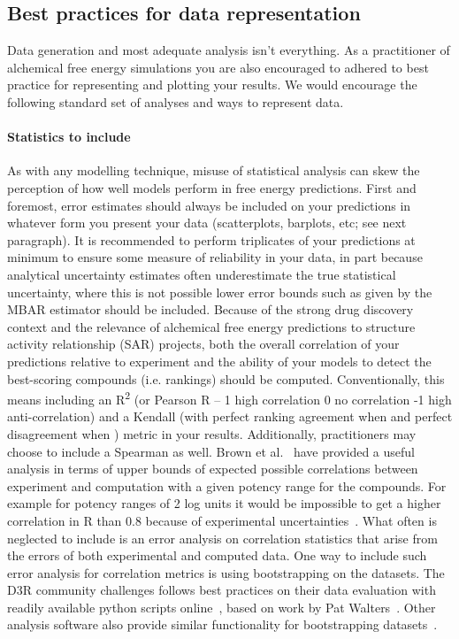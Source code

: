\documentclass[9pt,bestpractices]{livecoms}
\begin{document}
\subsection{Best practices for data representation}
\label{sec:plot_data}
Data generation and most adequate analysis isn't everything. As a practitioner of alchemical free energy simulations you are also encouraged to adhered to best practice for representing and plotting your results. We would encourage the following standard set of analyses and ways to represent data. 
\paragraph{Statistics to include}
As with any modelling technique, misuse of statistical analysis can skew the perception of how well models perform in free energy predictions. First and foremost, error estimates should always be included on your predictions in whatever form you present your data (scatterplots, barplots, etc; see next paragraph). It is recommended to perform triplicates of your predictions at minimum to ensure some measure of reliability in your data, in part because analytical uncertainty estimates often underestimate the true statistical uncertainty, where this is not possible lower error bounds such as given by the MBAR estimator should be included. 
%
Because of the strong drug discovery context and the relevance of alchemical free energy predictions to structure activity relationship (SAR) projects, both the overall correlation of your predictions relative to experiment and the ability of your models to detect the best-scoring compounds (i.e. rankings) should be computed. Conventionally, this means including an R\textsuperscript{2} (or Pearson R -- 1 high correlation 0 no correlation -1 high anti-correlation) and a Kendall \texttau{} (with perfect ranking agreement when  and perfect disagreement when ) metric in your results. Additionally, practitioners may choose to include a Spearman \textrho{} as well. Brown et al.~\cite{brown2009healthy} have provided a useful analysis in terms of upper bounds of expected possible correlations between experiment and computation with a given potency range for the compounds. For example for potency ranges of 2 log units it would be impossible to get a higher correlation in R than 0.8 because of experimental uncertainties~\cite{brown2009healthy}. What often is neglected to include is an error analysis on correlation statistics that arise from the errors of both experimental and computed data. One way to include such error analysis for correlation metrics is using bootstrapping on the datasets. The D3R community challenges follows best practices on their data evaluation with readily available python scripts online~\cite{2018drugdata}, based on work by Pat Walters~\cite{walters2013what}. Other analysis software also provide similar functionality for bootstrapping datasets~\cite{antonia2019michellab}. 
\end{document}

